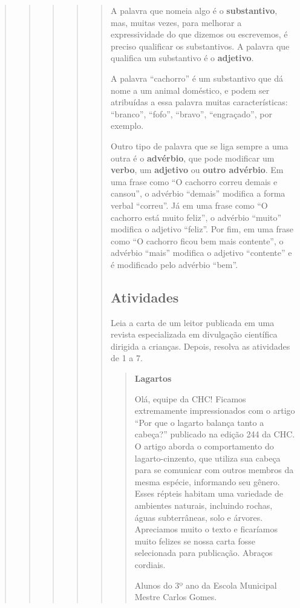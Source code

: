 \begin{quote}
\begin{quote}
\begin{quote}
\begin{quote}
\begin{quote}
A palavra que nomeia algo é o \textbf{substantivo}, mas, muitas vezes,
para melhorar a expressividade do que dizemos ou escrevemos, é preciso
qualificar os substantivos. A palavra que qualifica um substantivo é o
\textbf{adjetivo}.

A palavra ``cachorro'' é um substantivo que dá nome a um animal
doméstico, e podem ser atribuídas a essa palavra muitas características:
``branco'', ``fofo'', ``bravo'', ``engraçado'', por exemplo.

Outro tipo de palavra que se liga sempre a uma outra é o \textbf{advérbio},
que pode modificar um \textbf{verbo}, um \textbf{adjetivo} ou \textbf{outro
advérbio}. Em uma frase como ``O cachorro correu demais e cansou'', o advérbio
``demais'' modifica a forma verbal ``correu''. Já em uma frase como ``O cachorro
está muito feliz'', o advérbio ``muito'' modifica o adjetivo ``feliz''. Por fim,
em uma frase como ``O cachorro ficou bem mais contente'', o advérbio ``mais''
modifica o adjetivo ``contente'' e é modificado pelo advérbio ``bem''.

\subsection{Atividades}\label{atividades-6}

Leia a carta de um leitor publicada em uma revista especializada em
divulgação científica dirigida a crianças. Depois, resolva as atividades de 1 a 7.

\begin{quote}
\textbf{Lagartos}

Olá, equipe da CHC! Ficamos extremamente impressionados com o artigo ``Por que o lagarto balança tanto a cabeça?'' publicado na edição 244 da CHC. O artigo aborda o comportamento do lagarto-cinzento, que utiliza sua cabeça para se comunicar com outros membros da mesma espécie, informando seu gênero. Esses répteis habitam uma variedade de ambientes naturais, incluindo rochas, águas subterrâneas, solo e árvores. Apreciamos muito o texto e ficaríamos muito felizes se nossa carta fosse selecionada para publicação. Abraços cordiais.

Alunos do 3º ano da Escola Municipal Mestre Carlos Gomes.

\end{quote}


\end{quote}
\end{quote}
\end{quote}
\end{quote}
\end{quote}
